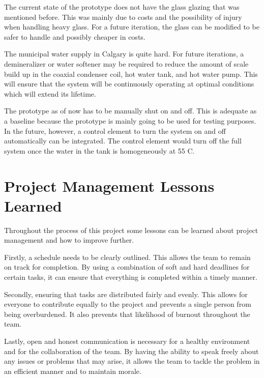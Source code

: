 \medskip
The current state of the prototype does not have the glass glazing that was mentioned before. This was mainly due to costs and the possibility of injury when handling heavy glass. For a future iteration, the glass can be modified to be safer to handle and possibly cheaper in costs.

\medskip
The municipal water supply in Calgary is quite hard. For future iterations, a demineralizer or water softener may be required to reduce the amount of scale build up in the coaxial condenser coil, hot water tank, and hot water pump. This will ensure that the system will be continuously operating at optimal conditions which will extend its lifetime.

\medskip
The prototype as of now has to be manually shut on and off. This is adequate as a baseline because the prototype is mainly going to be used for testing purposes. In the future, however, a control element to turn the system on and off automatically can be integrated. The control element would turn off the full system once the water in the tank is homogeneously at 55 \textdegree C.

\section{Project Management Lessons Learned}

\medskip
Throughout the process of this project some lessons can be learned about project management and how to improve further.

\medskip
Firstly, a schedule needs to be clearly outlined. This allows the team to remain on track for completion. By using a combination of soft and hard deadlines for certain tasks, it can ensure that everything is completed within a timely manner.

\medskip
Secondly, ensuring that tasks are distributed fairly and evenly. This allows for everyone to contribute equally to the project and prevents a single person from being overburdened. It also prevents that likelihood of burnout throughout the team.

\medskip
Lastly, open and honest communication is necessary for a healthy environment and for the collaboration of the team. By having the ability to speak freely about any issues or problems that may arise, it allows the team to tackle the problem in an efficient manner and to maintain morale.